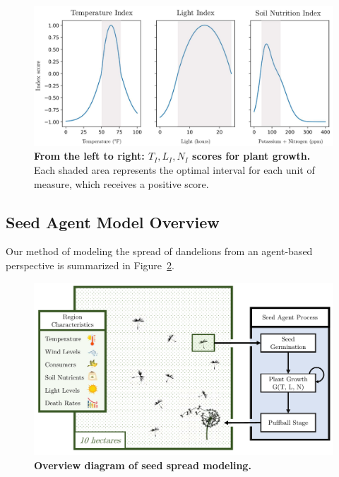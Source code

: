 \begin{figure}[h!]
\centering
    \includegraphics[scale=0.5]{figures/scoreindex.pdf}
    \captionsetup{width=0.9\textwidth}
    \caption{\textbf{From the left to right: \(T_I, L_I, N_I\) scores for plant growth.} Each shaded area represents the optimal interval for each unit of measure, which receives a positive score.}
    \label{fig:indexscoregraphs}
\end{figure}

\subsection{Seed Agent Model Overview}

Our method of modeling the spread of dandelions from an agent-based perspective is summarized in Figure~\ref{fig:partadiagram}.

\begin{figure}[htbp]
\centering
    \includegraphics[scale=0.8]{figures/seedspreadprocess2.pdf}
    \captionsetup{width=0.9\textwidth}
    \caption{\textbf{Overview diagram of seed spread modeling.} }
    \label{fig:partadiagram}
\end{figure}